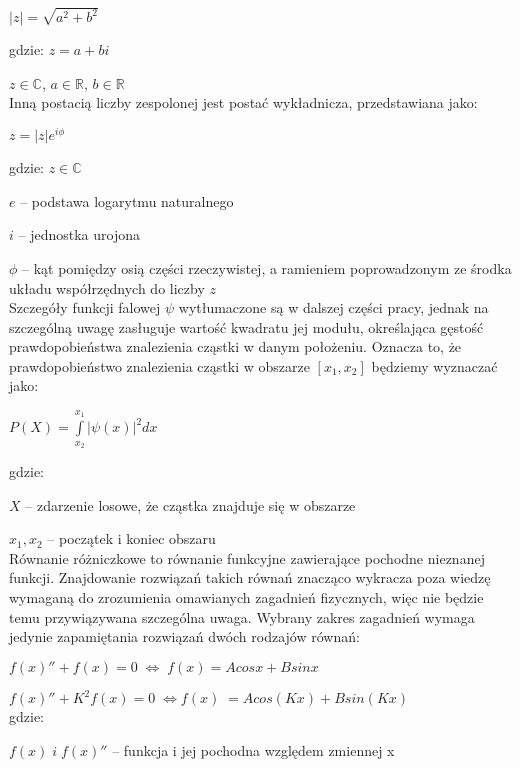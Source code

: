 \documentclass{SGGW-thesis}
\begin{document}
	\begin{center}
	$|z| = \sqrt{a^2+b^2}$
	\end{center}
	
	gdzie:
	$ z = a + bi$
	
	$z \in \mathbb{C}$,
	$a \in \mathbb{R}$,
	$b \in \mathbb{R}$\\
	
	Inną postacią liczby zespolonej jest postać wykładnicza, przedstawiana jako:
	
	\begin{center}
	$z = |z|e^{i\phi}$
	\end{center}
	
	gdzie:
	$z \in \mathbb{C}$
	
	$e$ -- podstawa logarytmu naturalnego
	
	$i$ -- jednostka urojona
	
	$\phi$ -- kąt pomiędzy osią części rzeczywistej, a ramieniem poprowadzonym ze środka układu współrzędnych do liczby $z$\\
	
	Szczegóły funkcji falowej $\psi$ wytłumaczone są w dalszej części pracy, jednak na szczególną uwagę zasługuje wartość kwadratu jej modułu, określająca gęstość prawdopobieństwa znalezienia cząstki w danym położeniu. Oznacza to, że prawdopobieństwo znalezienia cząstki w obszarze $[x_1, x_2]$ będziemy wyznaczać jako:
	\begin{center}
	 	$P(X) = \int\limits_{x_2}^{x_1} |\psi(x)|^2dx$
	\end{center}
	
	gdzie:
	
	$X$ -- zdarzenie losowe, że cząstka znajduje się w obszarze
	
	$x_1, x_2$ -- początek i koniec obszaru\\ 	
	
	Równanie różniczkowe to równanie funkcyjne zawierające pochodne nieznanej funkcji. Znajdowanie rozwiązań takich równań znacząco wykracza poza wiedzę wymaganą do zrozumienia omawianych zagadnień fizycznych, więc nie będzie temu przywiązywana szczególna uwaga. Wybrany zakres zagadnień wymaga jedynie zapamiętania rozwiązań dwóch rodzajów równań:
	
	$f(x)''+f(x)=0 \;\Longleftrightarrow\; f(x) = Acosx + Bsinx$
	
	$f(x)''+K^2f(x)=0 \;\Longleftrightarrow f(x)\; = Acos(Kx) + Bsin(Kx)$ \\

	gdzie:
	
	$f(x) \; i \; f(x)''$ -- funkcja i jej pochodna względem zmiennej x
\end{document}
